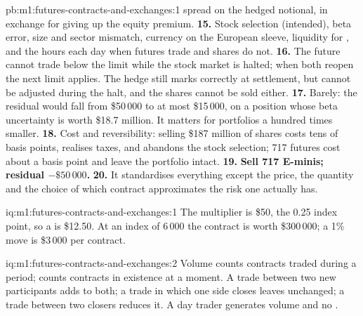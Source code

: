 \begin{solution}{pb:m1:futures-contracts-and-exchanges:1}
{spread} on the hedged notional, in exchange for giving up the equity
premium.
\textbf{15.} Stock selection (intended), beta error, size and sector
mismatch, currency on the European sleeve, liquidity for ,
and the hours each day when futures trade and shares do not.
\textbf{16.} The future cannot trade below the limit while the stock market
is halted; when both reopen the next limit applies. The hedge still marks
correctly at settlement, but cannot be adjusted during the halt, and the
shares cannot be sold either.
\textbf{17.} Barely: the residual would fall from \$50\,000 to at most
\$15\,000, on a position whose beta uncertainty is worth \$18.7 million. It
matters for portfolios a hundred times smaller.
\textbf{18.} Cost and reversibility: selling \$187 million of shares costs
tens of basis points, realises taxes, and abandons the stock selection; 717
futures cost about a basis point and leave the portfolio intact.
\textbf{19.} \textbf{Sell 717 E-minis; residual $-\$50\,000$.}
\textbf{20.} It standardises everything except the price, the quantity and
the choice of which contract approximates the risk one actually has.
\end{solution}

\begin{solution}{iq:m1:futures-contracts-and-exchanges:1}
The multiplier is \$50, the  0.25 index point, so a  is \$12.50. At
an index of 6\,000 the contract is worth \$300\,000; a 1\% move is \$3\,000 per
contract.
\end{solution}

\begin{solution}{iq:m1:futures-contracts-and-exchanges:2}
Volume counts contracts traded during a period;  counts
contracts in existence at a moment. A trade between two new participants
adds to both; a trade in which one side closes leaves 
unchanged; a trade between two closers reduces it. A day trader generates
volume and no .
\end{solution}

